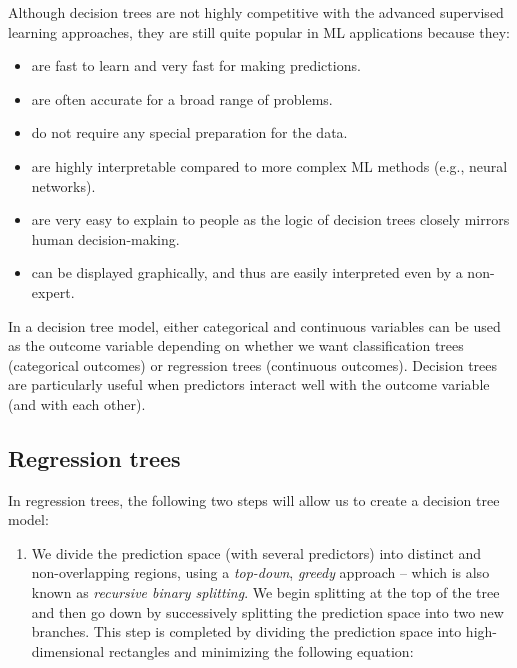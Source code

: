 \documentclass[
]{book}
\providecommand{\tightlist}{%
  \setlength{\itemsep}{0pt}\setlength{\parskip}{0pt}}
\begin{document}
Although decision trees are not highly competitive with the advanced supervised learning approaches, they are still quite popular in ML applications because they:

\begin{itemize}
\tightlist
\item
  are fast to learn and very fast for making predictions.
\item
  are often accurate for a broad range of problems.
\item
  do not require any special preparation for the data.
\item
  are highly interpretable compared to more complex ML methods (e.g., neural networks).
\item
  are very easy to explain to people as the logic of decision trees closely mirrors human decision-making.
\item
  can be displayed graphically, and thus are easily interpreted even by a non-expert.
\end{itemize}

In a decision tree model, either categorical and continuous variables can be used as the outcome variable depending on whether we want classification trees (categorical outcomes) or regression trees (continuous outcomes). Decision trees are particularly useful when predictors interact well with the outcome variable (and with each other).

\hypertarget{regression-trees}{%
\subsection{Regression trees}\label{regression-trees}}

In regression trees, the following two steps will allow us to create a decision tree model:

\begin{enumerate}
\def\labelenumi{\arabic{enumi}.}
\tightlist
\item
  We divide the prediction space (with several predictors) into distinct and non-overlapping regions, using a \emph{top-down}, \emph{greedy} approach -- which is also known as \emph{recursive binary splitting}. We begin splitting at the top of the tree and then go down by successively splitting the prediction space into two new branches. This step is completed by dividing the prediction space into high-dimensional rectangles and minimizing the following equation:
\end{enumerate}
\end{document}
